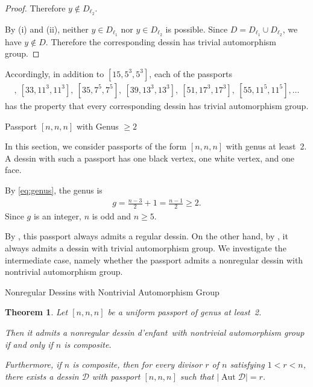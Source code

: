 \documentclass[12pt,reqno]{amsart}
\makeatletter
\newif\if@noindentafterheading
\renewcommand\section{\@startsection{section}{1}{\z@}%
  {-3.5ex \@plus -1ex \@minus -.2ex}%
  {2.6ex \@plus .2ex}%
  {\normalfont\large\bfseries}%
}
\renewcommand\subsection{\@startsection{subsection}{2}{\z@}%
  {-2.5ex \@plus -.3ex \@minus -.2ex}%
  {1.5ex \@plus .2ex}%
  {\normalfont\bfseries}%
}
\let\orig@section\section
\renewcommand\section{%
  \@ifstar{\section@star}{\section@nostar}%
}
\newcommand\section@nostar{%
  \@ifnextchar[{\section@opt}{\section@noopt}%
}
\newcommand\section@opt[2][]{%
  \global\@noindentafterheadingtrue
  \orig@section[#1]{#2}%
  \global\@noindentafterheadingfalse
}
\newcommand\section@noopt[1]{%
  \global\@noindentafterheadingtrue
  \orig@section{#1}%
  \global\@noindentafterheadingfalse
}
\newcommand\section@star[1]{%
  \global\@noindentafterheadingtrue
  \orig@section*{#1}%
  \global\@noindentafterheadingfalse
}
\let\orig@subsection\subsection
\renewcommand\subsection{%
  \@ifstar{\subsection@star}{\subsection@nostar}%
}
\newcommand\subsection@nostar{%
  \@ifnextchar[{\subsection@opt}{\subsection@noopt}%
}
\newcommand\subsection@opt[2][]{%
  \global\@noindentafterheadingtrue
  \orig@subsection[#1]{#2}%
  \global\@noindentafterheadingfalse
}
\newcommand\subsection@noopt[1]{%
  \global\@noindentafterheadingtrue
  \orig@subsection{#1}%
  \global\@noindentafterheadingfalse
}
\newcommand\subsection@star[1]{%
  \global\@noindentafterheadingtrue
  \orig@subsection*{#1}%
  \global\@noindentafterheadingfalse
}
\newcommand{\msD}{\mathscr{D}}
\newcommand{\HL}{\vspace{2mm}}							%
\newcommand{\f}[2]{\frac{#1}{#2}}							%
\newcommand{\vt}[1]{\left\lvert #1 \right\rvert}					%
\DeclareMathOperator{\Aut}{Aut}							%
\theoremstyle{mythmstyle}
\newtheorem{thm}[lemma]{Theorem}
\theoremstyle{mydefstyle}
\newcommand{\dde}{dessin d'enfant\xspace}
\newcommand{\AD}{\Aut{\msD}}
\numberwithin{equation}{section}
\newcommand{\thmclassone}{Let $[n,n,n]$ be a uniform passport of genus at least~2.

Then it admits a nonregular \dde\ with nontrivial automorphism group
if and only if $n$ is composite.

Furthermore, if $n$ is composite, then for every divisor $r$ of $n$
satisfying $1<r<n$, there exists a dessin $\msD$ with passport $[n,n,n]$
such that $\vt{\AD}=r$.}
\makeatother
\begin{document}
\begin{proof}
Therefore $y \notin D_{\ell_{2}}$.
\HL

By (i) and (ii), neither $y\in D_{\ell_{1}}$ nor $y\in D_{\ell_{2}}$ is possible. Since
$D = D_{\ell_{1}} \cup D_{\ell_{2}}$,
we have $y \notin D$.
Therefore the corresponding dessin has trivial automorphism group.
\end{proof}

Accordingly, in addition to $[15,5^{3},5^{3}]$, each of the passports
\begin{align}
[21,7^{3},7^{3}],\ [33,11^{3},11^{3}],\ [35,7^{5},7^{5}],\ [39,13^{3},13^{3}],\ [51,17^{3},17^{3}],\ [55,11^{5},11^{5}],\ldots
\end{align}
has the property that every corresponding dessin has trivial automorphism group.

\section{Passport $[n, n, n]$ with Genus $\ge 2$}
\label{sec:class1}

In this section, we consider passports of the form $[n, n, n]$ with genus at least~2.
A dessin with such a passport has one black vertex, one white vertex, and one face.

By \eqref{eq:genus}, the genus is
\begin{align}
\label{eq:genusclass1}
g=\f{n-3}{2}+1=\f{n-1}{2} \ge 2.
\end{align}
Since $g$ is an integer, $n$ is odd and $n \ge 5$.

By \cite[Corollary~6.2]{Ohnishi26}, this passport always admits a regular dessin.
On the other hand, by \cite[Proposition~7.1]{Ohnishi26}, it always admits a dessin with trivial automorphism group.
We investigate the intermediate case, namely whether the passport admits a nonregular dessin
with nontrivial automorphism group.

\subsection{Nonregular Dessins with Nontrivial Automorphism Group}

\begin{thm}
\label{thm:class1}
\thmclassone
\end{thm}
\end{document}
